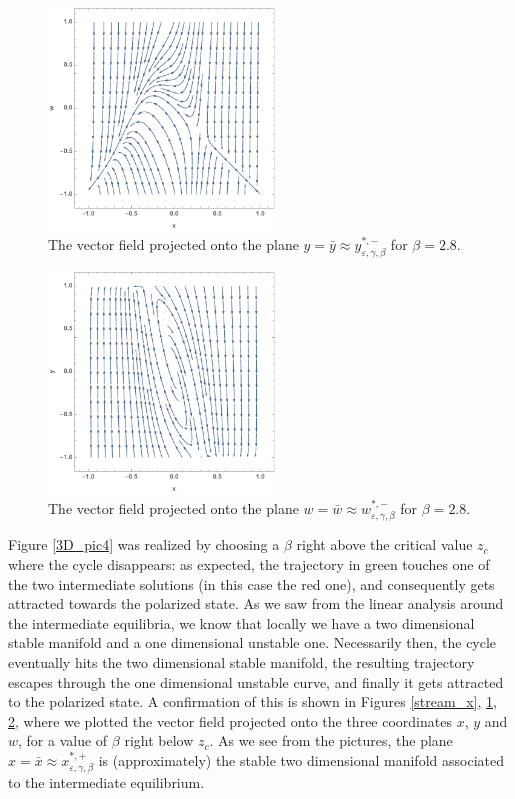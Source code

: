 \documentclass[a4paper,10pt,leqno]{amsart}
\theoremstyle{plain}
\begin{document}
\begin{figure}   
\centering   
\includegraphics[width=6cm]{stream_y.pdf}   
\caption{The vector field projected onto the plane $y = \bar{y} \approx y^{*,-}_{\varepsilon,\gamma,\beta}$ for $\beta = 2.8$.}   
\label{stream_y}   
\end{figure}   

\begin{figure}   
\centering   
\includegraphics[width=6cm]{stream_w.pdf}   
\caption{The vector field projected onto the plane $w = \bar{w} \approx w^{*,-}_{\varepsilon,\gamma,\beta}$ for $\beta = 2.8$.}   
\label{stream_w}   
\end{figure}   
Figure \ref{3D_pic4} was realized by choosing a $\beta$ right above the critical value $z_c$ where the cycle disappears: as expected, the trajectory in green touches one of the two intermediate solutions (in this case the red one), and consequently gets attracted towards the polarized state. As we saw from the linear analysis around the intermediate equilibria, we know that locally we have a two dimensional stable manifold and a one dimensional unstable one. Necessarily then, the cycle eventually hits the two dimensional stable manifold, the resulting trajectory escapes through the one dimensional unstable curve, and finally it gets attracted to the polarized state. A confirmation of this is shown in Figures \ref{stream_x}, \ref{stream_y}, \ref{stream_w}, where we plotted the vector field projected onto the three coordinates $x$, $y$ and $w$, for a value of $\beta$ right below $z_c$. As we see from the pictures, the plane $x = \bar{x} \approx x^{*,+}_{\varepsilon, \gamma, \beta}$ is (approximately) the stable two dimensional manifold associated to the intermediate equilibrium.
\end{document}
